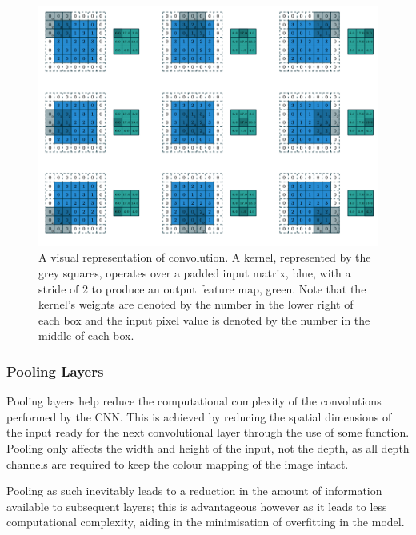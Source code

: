 \begin{figure}
	\begin{center}
		\includegraphics[scale=0.45]{Chapter2/figs/kernel.png}
	\end{center}
	\caption{A visual representation of convolution. A kernel, represented by the grey squares, operates over a padded input matrix, blue, with a stride of 2 to produce an output feature map, green. Note that the kernel's weights are denoted by the number in the lower right of each box and the input pixel value is denoted by the number in the middle of each box. \cite{dumoulin_160307285_2018}}
	\label{fig:kernels}
\end{figure}


\subsubsection{Pooling Layers}\label{ch:Background,sec:CNN,sub:CNN,subsubsec:pooling}

Pooling layers help reduce the computational complexity of the convolutions performed by the CNN. This is achieved by reducing the spatial dimensions of the input ready for the next convolutional layer through the use of some function. Pooling only affects the width and height of the input, not the depth, as all depth channels are required to keep the colour mapping of the image intact. 

Pooling as such inevitably leads to a reduction in the amount of information available to subsequent layers; this is advantageous however as it leads to less computational complexity, aiding in the minimisation of overfitting in the model. 


